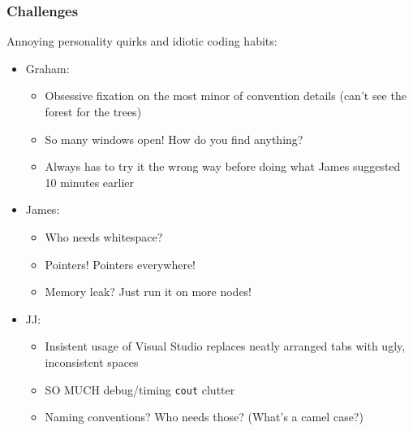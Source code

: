 \documentclass[usernames,dvipsnames]{beamer}
\begin{document}
\begin{frame}	
	\frametitle{Challenges}
	
	\begin{alertblock}{\small Annoying personality quirks and idiotic coding habits:}
		\begin{itemize}
			\small
			\setlength\itemsep{0.1pt}
			\item Graham: \\ \vspace{-5pt}
				\begin{itemize}
					\small
					\setlength\itemsep{0.1pt}
					\item Obsessive fixation on the most minor of convention details (can't see the forest for the trees)
					\item So many windows open! How do you find anything?
					\item Always has to try it the wrong way before doing what James suggested 10 minutes earlier \vspace{-5pt}
				\end{itemize}
			\item James: \\ \vspace{-5pt}
				\begin{itemize}
					\small
					\setlength\itemsep{0.1pt}
					\item Who needs whitespace?
					\item Pointers! Pointers everywhere!
					\item Memory leak? Just run it on more nodes! \vspace{-5pt}
				\end{itemize}
			\item JJ: \\ \vspace{-5pt}
				\begin{itemize}
					\small
					\setlength\itemsep{0.1pt}
					\item Insistent usage of Visual Studio replaces neatly arranged tabs with ugly, inconsistent spaces
					\item SO MUCH debug/timing \texttt{cout} clutter
					\item Naming conventions? Who needs those? (What's a camel case?)
				\end{itemize}
		\end{itemize}
	\end{alertblock}

\end{frame}
\end{document}

